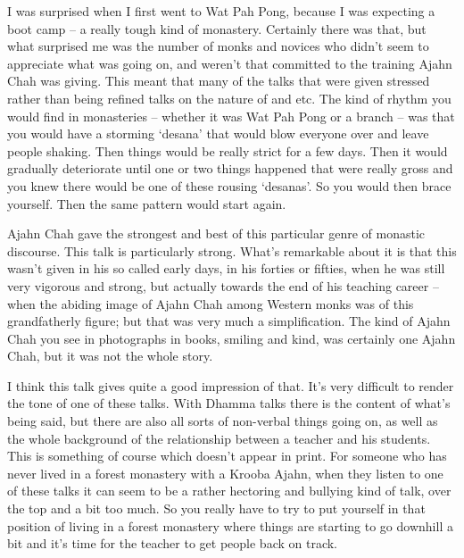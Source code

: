 I was surprised when I first went to Wat Pah Pong, because I was expecting a boot camp -- a really tough kind of monastery. Certainly there was that, but what surprised me was the number of monks and novices who didn't seem to appreciate what was going on, and weren't that committed to the training Ajahn Chah was giving. This meant that many of the talks that were given stressed  rather than being refined talks on the nature of  and  etc. The kind of rhythm you would find in monasteries -- whether it was Wat Pah Pong or a branch -- was that you would have a storming `desana' that would blow everyone over and leave people shaking. Then things would be really strict for a few days. Then it would gradually deteriorate until one or two things happened that were really gross and you knew there would be one of these rousing `desanas'. So you would then brace yourself. Then the same pattern would start again.

Ajahn Chah gave the strongest and best of this particular genre of monastic discourse. This talk is particularly strong. What's remarkable about it is that this wasn't given in his so called early days, in his forties or fifties, when he was still very vigorous and strong, but actually towards the end of his teaching career -- when the abiding image of Ajahn Chah among Western monks was of this grandfatherly figure; but that was very much a simplification. The kind of Ajahn Chah you see in photographs in books, smiling and kind, was certainly one Ajahn Chah, but it was not the whole story.

I think this talk gives quite a good impression of that. It's very difficult to render the tone of one of these talks. With Dhamma talks there is the content of what's being said, but there are also all sorts of non-verbal things going on, as well as the whole background of the relationship between a teacher and his students. This is something of course which doesn't appear in print. For someone who has never lived in a forest monastery with a Krooba Ajahn, when they listen to one of these talks it can seem to be a rather hectoring and bullying kind of talk, over the top and a bit too much. So you really have to try to put yourself in that position of living in a forest monastery where things are starting to go downhill a bit and it's time for the teacher to get people back on track.

\endgroup

